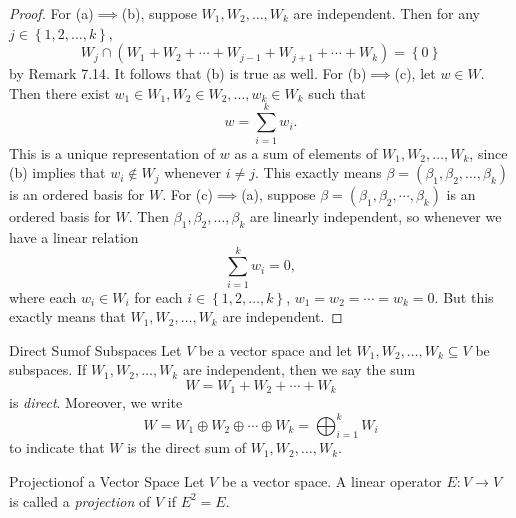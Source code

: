 \documentclass[linearalgebra]{subfiles}
\begin{document}
    \begin{proof}
        For (a)$\implies$(b), suppose $W_1, W_2, \ldots, W_k$ are independent. Then for any $j\in \left\lbrace 1, 2, \ldots, k \right\rbrace$, 
        \begin{equation*}
            W_j\cap \left( W_1+W_2+\cdots+W_{j-1}+W_{j+1}+\cdots+W_k \right) = \left\lbrace 0 \right\rbrace 
        \end{equation*}
        by Remark 7.14. It follows that (b) is true as well. For (b)$\implies$(c), let $w\in W$. Then there exist $w_1\in W_1, W_2\in W_2, \ldots, w_k\in W_k$ such that
        \begin{equation*}
            w = \sum^{k}_{i=1} w_i.
        \end{equation*}
        This is a unique representation of $w$ as a sum of elements of $W_1, W_2, \ldots, W_k$, since (b) implies that $w_i\notin W_j$ whenever $i\neq j$. This exactly means $\beta = \left( \beta_1, \beta_2, \ldots, \beta_k \right)$ is an ordered basis for $W$. For (c)$\implies$(a), suppose $\beta = \left( \beta_1, \beta_2, \cdots, \beta_k \right)$ is an ordered basis for $W$. Then $\beta_1, \beta_2, \ldots, \beta_k$ are linearly independent, so whenever we have a linear
        relation
        \begin{equation*}
            \sum^{k}_{i=1} w_i = 0,
        \end{equation*}
        where each $w_i\in W_i$ for each $i\in \left\lbrace 1, 2, \ldots, k \right\rbrace$, $w_1 = w_2 = \cdots = w_k = 0$. But this exactly means that $W_1, W_2, \ldots, W_k$ are independent.
    \end{proof}

    \begin{definition}{Direct Sum}{of Subspaces}
        Let $V$ be a vector space and let $W_1, W_2, \ldots, W_k\subseteq V$ be subspaces. If $W_1, W_2, \ldots, W_k$ are independent, then we say the sum
        \begin{equation*}
            W = W_1 + W_2 + \cdots + W_k
        \end{equation*}
        is \emph{direct}. Moreover, we write
        \begin{equation*}
            W = W_1\oplus W_2\oplus \cdots\oplus W_k = \bigoplus^{k}_{i=1} W_i
        \end{equation*}
        to indicate that $W$ is the direct sum of $W_1, W_2, \ldots, W_k$.
    \end{definition}

    \begin{definition}{Projection}{of a Vector Space}
        Let $V$ be a vector space. A linear operator $E:V\to V$ is called a \emph{projection} of $V$ if $E^2 = E$.
    \end{definition}
\end{document}
